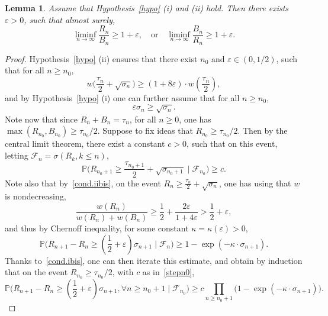 \documentclass[11pt]{article}
\newtheorem {lem} {Lemma} [section]
\newcommand{\1}{{\text{\Large $\mathfrak 1$}}}
\begin{document}
\begin{lem}\label{lem:loc1}
Assume that Hypothesis~\ref{hypo} (i) and (ii) hold. Then there exists $\varepsilon>0$, such that almost surely, 
$$\liminf_{n\to \infty} \frac{R_n}{B_n} \ge 1+\varepsilon,\quad  \text{or}\quad \liminf_{n\to \infty} \frac{B_n}{R_n} \ge 1+\varepsilon. $$ 
\end{lem}
\begin{proof}
Hypothesis~\ref{hypo} (ii) ensures that there exist $n_0$ and $\varepsilon\in(0,1/2)$, such that for all $n\ge n_0$, 
\begin{equation}\label{cond.iibis}
w\big( \frac{\tau_n}{2} + \sqrt{\sigma_n}\big) \ge (1+8\varepsilon)\cdot w(\frac{\tau_n}{2}),
\end{equation}
and by Hypothesis~\ref{hypo} (i) one can further assume that for all $n\ge n_0$, 
 \begin{equation}\label{cond.ibis}
\varepsilon \sigma_n \ge  \sqrt{\sigma_n}. 
\end{equation}
Note now that since $R_n + B_n = \tau_n$, for all $n\ge 0$, one has $\max(R_{n_0},B_{n_0}) \ge \tau_{n_0} /2$. Suppose to fix ideas that $R_{n_0} \ge \tau_{n_0} /2$. Then by the central limit theorem, 
there exist a constant $c>0$, such that on this event, letting $\mathcal F_n = \sigma(R_k,k\le n)$, 
\begin{equation}\label{stepn0}
\mathbb P\Big(R_{n_0+1} \ge \frac{\tau_{n_0+1}}{2} + \sqrt{\sigma_{n_0+1}}\mid \mathcal F_{n_0}\Big)\ge c.
\end{equation}
Note also that by~\eqref{cond.iibis}, on the event $R_n \ge \frac{\tau_n}{2} + \sqrt{\sigma_n}$, one has using that $w$ is nondecreasing, 
$$\frac{w(R_n)}{w(R_n) + w(B_n)}\ge \frac 12 + \frac{2\varepsilon}{1+4\varepsilon}> \frac 12 + \varepsilon, $$ 
and thus by Chernoff inequality, for some constant $\kappa=\kappa(\varepsilon)>0$, 
\begin{equation}\label{eq.chernoff}
\mathbb P\Big(R_{n+1} - R_n \ge (\frac 12 + \varepsilon ) \sigma_{n+1} \mid \mathcal F_n\Big) \ge 1 - \exp(- \kappa \cdot\sigma_{n+1}).  
\end{equation}
Thanks to~\eqref{cond.ibis}, one can then iterate this estimate, and obtain by induction that on the event $R_{n_0}\ge \tau_{n_0}/2$, with $c$ as in~\eqref{stepn0}, 
\begin{equation}\label{eq:c'}
\mathbb P\Big(R_{n+1}-R_n \ge (\frac 12 + \varepsilon ) \sigma_{n+1}, \forall n \ge n_0+1 \mid \mathcal F_{n_0}\Big)  \ge c \prod_{n\ge n_0+1} \big(1-\exp(- \kappa \cdot\sigma_{n+1})\big). 
\end{equation} 

\end{proof}
\end{document}
